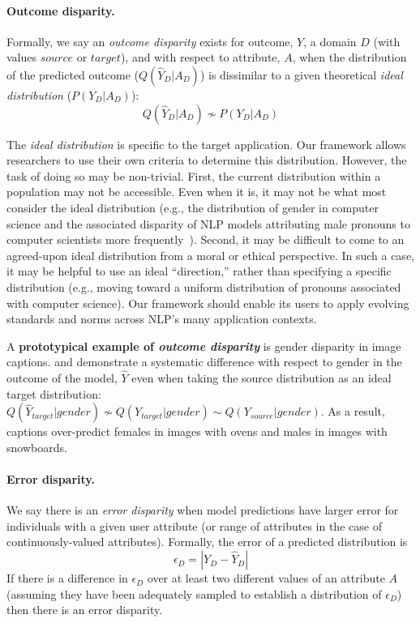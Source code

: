 \documentclass[11pt,a4paper]{article}
\begin{document}
\paragraph{Outcome disparity.} Formally, we say an \textit{outcome disparity} exists for outcome, $Y$, a domain $D$ (with values $source$ or $target$), and with respect to attribute, $A$, when the distribution of the predicted outcome ($Q(\hat{Y}_D|A_D)$) is dissimilar to a given theoretical \textit{ideal distribution} ($P(Y_D|A_D)$):  
$$Q(\hat{Y}_D|A_D) \nsim P(Y_D|A_D)$$

The \textit{ideal distribution} is specific to the target application. Our framework allows researchers to use their own criteria to determine this distribution. However, the task of doing so may be non-trivial. 
First, the current distribution within a population may not be accessible. Even when it is, it may not be what most consider the ideal distribution (e.g., the distribution of gender in computer science and the associated disparity of NLP models attributing male pronouns to computer scientists more frequently~\cite{hovy2015demographic}). 
Second, it may be difficult to come to an agreed-upon ideal distribution from a moral or ethical perspective. 
In such a case, it may be helpful to use an ideal ``direction,'' rather than specifying a specific distribution (e.g., moving toward a uniform distribution of pronouns associated with computer science).  
Our framework should enable its users to apply evolving standards and norms across NLP's many application contexts.


A \textbf{prototypical example of \textit{outcome disparity}} is gender disparity in image captions.  and  demonstrate a systematic difference with respect to gender in the outcome of the model, $\hat{Y}$ even when taking the source distribution as an ideal target distribution: $Q(\hat{Y}_{target}|gender) \nsim Q(Y_{target}|gender) \sim  Q(Y_{source}|gender)$. As a result, captions over-predict females in images with ovens and males in images with snowboards. 

\paragraph{Error disparity.} We say there is an \textit{error disparity} when model predictions have larger error for individuals with a given user attribute (or range of attributes in the case of continuously-valued attributes).
Formally, the error of a predicted distribution is
$$\epsilon_D = |Y_D - \hat{Y}_D|$$
If there is a difference in $\epsilon_D$ over at least two different values of an attribute $A$ (assuming they have been adequately sampled to establish a distribution of $\epsilon_D$) then there is an error disparity. 
\end{document}

